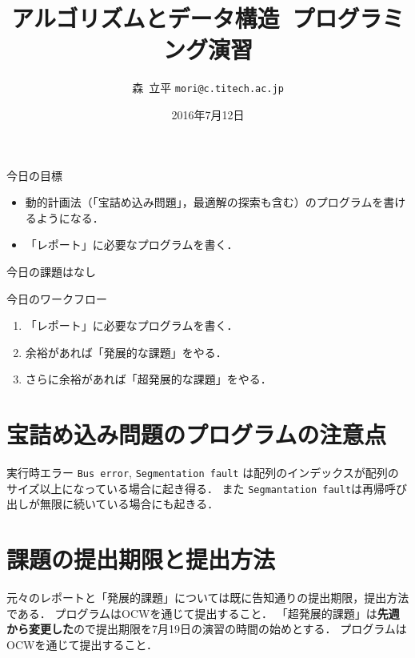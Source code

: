 \documentclass[a4paper,twoside,onecolumn,openany,article]{memoir}
\title{アルゴリズムとデータ構造~プログラミング演習}
\date{2016年7月12日}
\author{森~立平 \texttt{mori@c.titech.ac.jp}}
\theoremstyle{remark}
\begin{document}
\maketitle

\noindent
今日の目標
\begin{itemize}
\item 動的計画法（「宝詰め込み問題」，最適解の探索も含む）のプログラムを書けるようになる．
\item 「レポート」に必要なプログラムを書く．
\end{itemize}

\noindent
今日の課題はなし

\vspace{.5em}
\noindent
今日のワークフロー
\begin{enumerate}
\item 「レポート」に必要なプログラムを書く．
\item 余裕があれば「発展的な課題」をやる．
\item さらに余裕があれば「超発展的な課題」をやる．
\end{enumerate}

\section{宝詰め込み問題のプログラムの注意点}
実行時エラー \texttt{Bus error}, \texttt{Segmentation fault} は配列のインデックスが配列のサイズ以上になっている場合に起き得る．
また \texttt{Segmantation fault}は再帰呼び出しが無限に続いている場合にも起きる．



\section{課題の提出期限と提出方法}
元々のレポートと「発展的課題」については既に告知通りの提出期限，提出方法である．
プログラムはOCWを通じて提出すること．
「超発展的課題」は\textbf{先週から変更した}ので提出期限を7月19日の演習の時間の始めとする．
プログラムはOCWを通じて提出すること．
\end{document}
